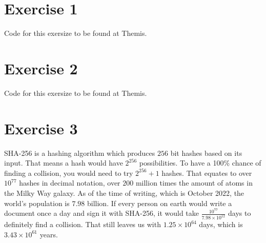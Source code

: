\documentclass[twoside, a4paper, fleqn, reqno]{article}
\begin{document}
\maketitle

\section*{Exercise 1}
Code for this exersize to be found at Themis.

\section*{Exercise 2}
Code for this exersize to be found at Themis.

\section*{Exercise 3}
SHA-256 is a hashing algorithm which produces $256$ bit hashes based on its input.
That means a hash would have $2^{256}$ possibilities.
To have a 100\% chance of finding a collision, you would need to try $2^{256} + 1$ hashes.
That equates to over $10^{77}$ hashes in decimal notation, over $200$ million times the
amount of atoms in the Milky Way galaxy.
As of the time of writing, which is October 2022, the world's population is $7.98$ billion.
If every person on earth would write a document once a day and sign it with SHA-256,
it would take $\frac{10^{77}}{7.98\times10^{12}}$ days to definitely find a collision.
That still leaves us with $1.25\times10^{64}$ days, which is $3.43\times10^{61}$ years.
\end{document}
